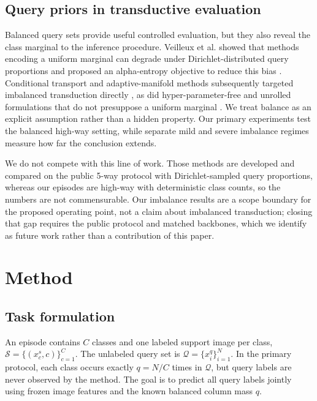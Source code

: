 \documentclass[]{spie}
\begin{document}
\subsection{Query priors in transductive evaluation}

Balanced query sets provide useful controlled evaluation, but they also reveal
the class marginal to the inference procedure. Veilleux et al. showed that
methods encoding a uniform marginal can degrade under Dirichlet-distributed
query proportions and proposed an alpha-entropy objective to reduce this bias
\cite{realistictransduction}. Conditional transport and adaptive-manifold
methods subsequently targeted imbalanced transduction directly
\cite{conditionaltransport,adaptivemanifold}, as did hyper-parameter-free and
unrolled formulations that do not presuppose a uniform marginal
\cite{paddle,unem}. We treat balance as an explicit
assumption rather than a hidden property. Our primary experiments test the
balanced high-way setting, while separate mild and severe imbalance regimes
measure how far the conclusion extends.

We do not compete with this line of work. Those methods are developed and
compared on the public 5-way protocol with Dirichlet-sampled query proportions,
whereas our episodes are high-way with deterministic class counts, so the
numbers are not commensurable. Our imbalance results are a scope boundary for
the proposed operating point, not a claim about imbalanced transduction; closing
that gap requires the public protocol and matched backbones, which we identify
as future work rather than a contribution of this paper.

\section{Method}
\label{sec:method}

\subsection{Task formulation}

An episode contains $C$ classes and one labeled support image per class,
$\mathcal{S}=\{(x_c^s,c)\}_{c=1}^{C}$. The unlabeled query set is
$\mathcal{Q}=\{x_i^q\}_{i=1}^{N}$. In the primary protocol, each class occurs
exactly $q=N/C$ times in $\mathcal{Q}$, but query labels are never observed by
the method. The goal is to predict all query labels jointly using frozen image
features and the known balanced column mass $q$.
\end{document}

